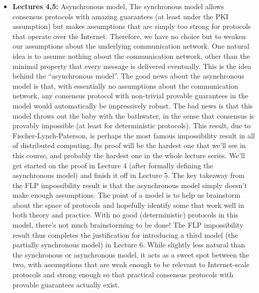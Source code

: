 \begin{itemize}
    \item \textbf{Lectures 4,5: }Asynchronous model, The synchronous model allows consensus protocols with amazing guarantees (at least under
the PKI assumption) but makes assumptions that are simply too strong for protocols that
operate over the Internet. Therefore, we have no choice but to weaken our assumptions about
the underlying communication network. One natural idea is to assume nothing about the
communication network, other than the minimal property that every message is delivered
eventually. This is the idea behind the “asynchronous model”.
The good news about the asynchronous model is that, with essentially no assumptions
about the communication network, any consensus protocol with non-trivial provable guarantees in the model would automatically be impressively robust. The bad news is that this
model throws out the baby with the bathwater, in the sense that consensus is provably impossible (at least for deterministic protocols). This result, due to Fischer-Lynch-Paterson,
is perhaps the most famous impossibility result in all of distributed computing. Its proof
will be the hardest one that we’ll see in this course, and probably the hardest one in the
whole lecture series. We’ll get started on the proof in Lecture 4 (after formally defining the
asynchronous model) and finish it off in Lecture 5.
The key takeaway from the FLP impossibility result is that the asynchronous model simply doesn’t make enough assumptions. The point of a model is to help us brainstorm about the space of protocols and hopefully identify some that work well in both theory and
practice. With no good (deterministic) protocols in this model, there’s not much brainstorming to be done! The FLP impossibility result thus completes the justification for introducing
a third model (the partially synchronous model) in Lecture 6. While slightly less natural than
the synchronous or asynchronous model, it acts as a sweet spot between the two, with assumptions that are weak enough to be relevant to Internet-scale protocols and strong enough
so that practical consensus protocols with provable guarantees actually exist.


\end{itemize}
